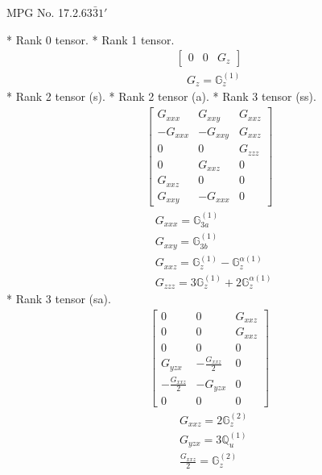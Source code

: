 \documentclass[fleqn,8pt,landscape]{jsarticle}
\begin{document}
\setcounter{MaxMatrixCols}{32}

\renewcommand{\tablename}{Table~}
\renewcommand{\figurename}{Figure~}
\begin{center}
\LARGE
MPG No. 17.2.63\quad$\bar{3}1'$
\end{center}
* Rank 0 tensor.
* Rank 1 tensor.
\begin{align*}
\begin{bmatrix} 0 & 0 & G_{z} \end{bmatrix}
\end{align*}
\begin{align*}
& G_{z} = \mathbb{G}_{z}^{(1)}
\end{align*}
* Rank 2 tensor (s).
* Rank 2 tensor (a).
* Rank 3 tensor (ss).
\begin{align*}
\begin{bmatrix} G_{xxx} & G_{xxy} & G_{xxz} \\ - G_{xxx} & - G_{xxy} & G_{xxz} \\ 0 & 0 & G_{zzz} \\ 0 & G_{xxz} & 0 \\ G_{xxz} & 0 & 0 \\ G_{xxy} & - G_{xxx} & 0 \end{bmatrix}
\end{align*}
\begin{align*}
& G_{xxx} = \mathbb{G}_{3a}^{(1)} \\
& G_{xxy} = \mathbb{G}_{3b}^{(1)} \\
& G_{xxz} = \mathbb{G}_{z}^{(1)} - \mathbb{G}_{z}^{\alpha(1)} \\
& G_{zzz} = 3 \mathbb{G}_{z}^{(1)} + 2 \mathbb{G}_{z}^{\alpha(1)}
\end{align*}
* Rank 3 tensor (sa).
\begin{align*}
\begin{bmatrix} 0 & 0 & G_{xxz} \\ 0 & 0 & G_{xxz} \\ 0 & 0 & 0 \\ G_{yzx} & - \frac{G_{xxz}}{2} & 0 \\ - \frac{G_{xxz}}{2} & - G_{yzx} & 0 \\ 0 & 0 & 0 \end{bmatrix}
\end{align*}
\begin{align*}
& G_{xxz} = 2 \mathbb{G}_{z}^{(2)} \\
& G_{yzx} = 3 \mathbb{Q}_{u}^{(1)} \\
& \frac{G_{xxz}}{2} = \mathbb{G}_{z}^{(2)}
\end{align*}
\end{document}
